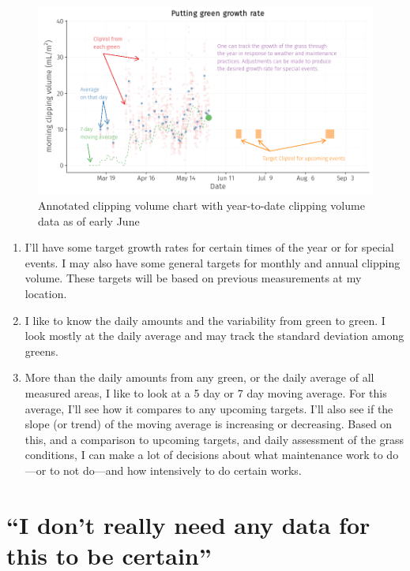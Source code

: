 \documentclass[12pt,b5,]{tufte-book}
\begin{document}
\begin{figure}
\centering
\includegraphics{img/y2018.png}
\caption{Annotated clipping volume chart with year-to-date clipping volume data as of early June}
\end{figure}

\begin{enumerate}
\def\labelenumi{\arabic{enumi}.}
\item
  I'll have some target growth rates for certain times of the year or for special events. I may also have some general targets for monthly and annual clipping volume. These targets will be based on previous measurements at my location.
\item
  I like to know the daily amounts and the variability from green to green. I look mostly at the daily average and may track the standard deviation among greens.
\item
  More than the daily amounts from any green, or the daily average of all measured areas, I like to look at a 5 day or 7 day moving average. For this average, I'll see how it compares to any upcoming targets. I'll also see if the slope (or trend) of the moving average is increasing or decreasing. Based on this, and a comparison to upcoming targets, and daily assessment of the grass conditions, I can make a lot of decisions about what maintenance work to do---or to not do---and how intensively to do certain works.
\end{enumerate}

\hypertarget{i-dont-really-need-any-data-for-this-to-be-certain}{%
\chapter{``I don't really need any data for this to be certain''}\label{i-dont-really-need-any-data-for-this-to-be-certain}}
\end{document}
